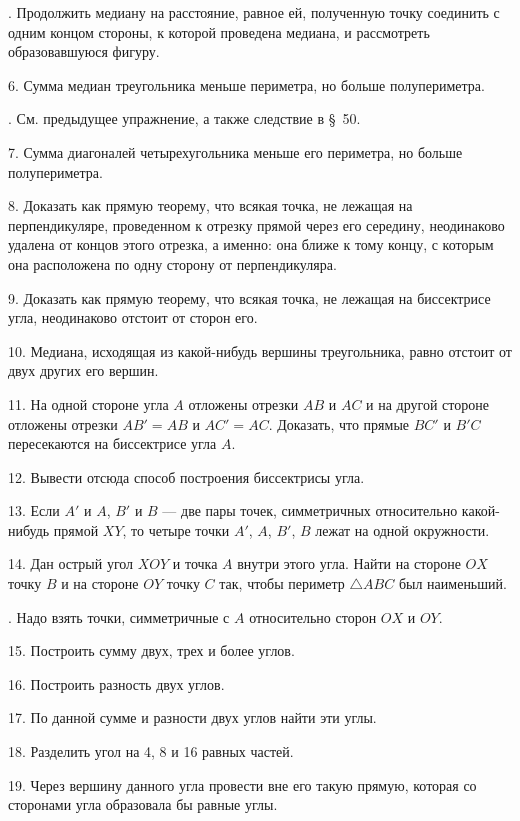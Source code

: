 \documentclass[oneside]{book}
\begin{document}
.
Продолжить медиану на расстояние, равное ей, полученную точку соединить с одним концом стороны, к которой проведена медиана, и рассмотреть образовавшуюся фигуру.

6.
Сумма медиан треугольника меньше периметра, но больше полупериметра.

.
См.
предыдущее упражнение, а также следствие в §~50.

7.
Сумма диагоналей четырехугольника меньше его периметра, но больше полупериметра.

8.
Доказать как прямую теорему, что всякая точка, не лежащая на перпендикуляре, проведенном к отрезку прямой через его середину, неодинаково удалена от концов этого отрезка, а именно:
она ближе к тому концу, с которым она расположена по одну сторону от перпендикуляра.

9.
Доказать как прямую теорему, что всякая точка, не лежащая на биссектрисе угла, неодинаково отстоит от сторон его.

10.
Медиана, исходящая из какой-нибудь вершины треугольника, равно отстоит от двух других его вершин.

11.
На одной стороне угла $A$ отложены отрезки $AB$ и $AC$ и на другой стороне отложены отрезки $AB'=AB$ и $AC' = AC$.
Доказать, что прямые $BC'$ и $B'C$ пересекаются на биссектрисе угла $A$.

12.
Вывести отсюда способ построения биссектрисы угла.

13.
Если $A'$ и $A$, $B'$ и $B$ — две пары точек, симметричных относительно какой-нибудь прямой $XY$, то четыре точки $A'$, $A$, $B'$, $B$ лежат на одной окружности.

14.
Дан острый угол $XOY$ и точка $A$ внутри этого угла.
Найти на стороне $OX$ точку $B$ и на стороне $OY$ точку $C$ так, чтобы периметр $\triangle ABC$ был наименьший.

.
Надо взять точки, симметричные с $A$ относительно сторон $OX$ и $OY$.


15.
Построить сумму двух, трех и более углов.

16.
Построить разность двух углов.

17.
По данной сумме и разности двух углов найти эти углы.

18.
Разделить угол на 4, 8 и 16 равных частей.

19.
Через вершину данного угла провести вне его такую прямую, которая со сторонами угла образовала бы равные углы.
\end{document}
